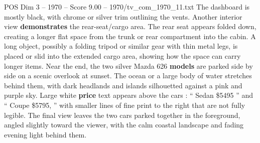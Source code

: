 \begin{textsample}{POS Dim 3 – 1970 – Score 9.00 – 1970/tv\_com\_1970\_11.txt}
The dashboard is mostly black, with chrome or silver trim outlining the vents.
Another interior view \textbf{demonstrates} the rear-seat/cargo area.
The rear seat appears folded down, creating a longer flat space from the trunk or rear compartment into the cabin.
A long object, possibly a folding tripod or similar gear with thin metal legs, is placed or slid into the extended cargo area, showing how the space can carry longer items.
Near the end, the two silver Mazda 626 \textbf{models} are parked side by side on a scenic overlook at sunset.
The ocean or a large body of water stretches behind them, with dark headlands and islands silhouetted against a pink and purple sky.
Large white \textbf{price} text appears above the cars : “ Sedan \$5495 ” and “ Coupe \$5795, ” with smaller lines of fine print to the right that are not fully legible.
The final view leaves the two cars parked together in the foreground, angled slightly toward the viewer, with the calm coastal landscape and fading evening light behind them.

\end{textsample}
